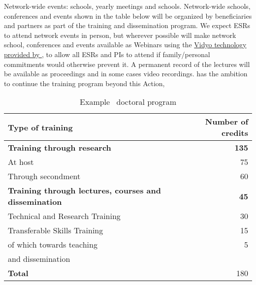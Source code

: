 \noindent \color{blue}Network-wide events: schools, yearly meetings and schools. \color{black}
Network-wide schools, conferences and events %
shown in the table below will be organized by \acronym beneficiaries
and partners as part of the training and dissemination program. 
We expect ESRs to attend network events in person, but 
wherever possible will make network school, conferences and events available as Webinars using
the \href{http://information-technology.web.cern.ch/services/fe/vidyo}{Vidyo technology provided by \cernentity}, to allow all \acronym ESRs and PIs to attend if family/personal commitments would 
otherwise prevent it. A permanent record of
the lectures will be available as proceedings and in some cases video recordings. 
\acronym has the ambition to continue the training program beyond this Action, 
\begin{wraptable}{l}{0.45\textwidth}
    \vspace{-2mm}
	\caption{Example \acronym\ doctoral program\label{tab:docProg}
	}\vspace{4mm}
	\small
	\begin{tabular}{p{50mm}r}
		\midrule
		Type of training & Number of credits \tabularnewline\midrule
		\textbf{Training through research}  & \textbf{135} \tabularnewline
		\hspace{5mm}At host & 75 \tabularnewline
		\hspace{5mm}Through secondment  & 60 \tabularnewline\midrule
		\textbf{Training through lectures, courses and dissemination} &  \textbf{45} \tabularnewline
		\hspace{5mm}Technical and Research Training & 30 \tabularnewline
		\hspace{5mm}Transferable Skills Training & 15 \tabularnewline
		\hspace{10mm}of which towards teaching & 5\tabularnewline
        \hspace{10mm}and dissemination & \tabularnewline
		\textbf{Total} &  180 \tabularnewline
		\bottomrule
	\end{tabular}
    \vspace{-2mm}
\end{wraptable}
